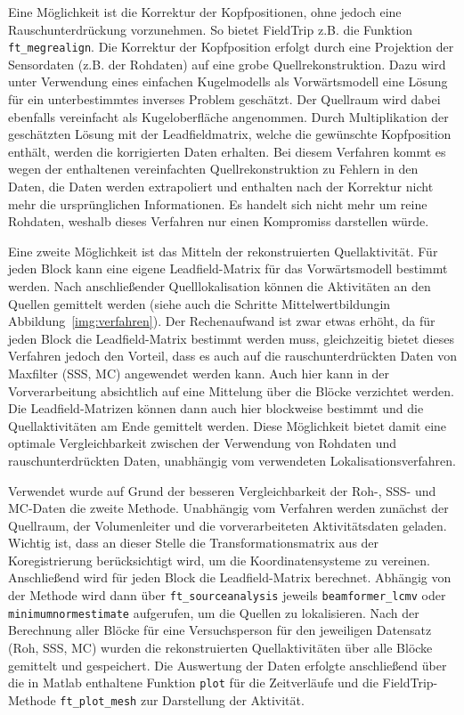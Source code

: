 \documentclass[doc,a4paper,12pt]{apa6}
\begin{document}
Eine Möglichkeit ist die Korrektur der Kopfpositionen, ohne jedoch eine Rauschunterdrückung vorzunehmen. So bietet FieldTrip z.B. die Funktion \texttt{ft\_megrealign}. Die Korrektur der Kopfposition erfolgt durch eine Projektion der Sensordaten (z.B. der Rohdaten) auf eine grobe Quellrekonstruktion. Dazu wird unter Verwendung eines einfachen Kugelmodells als Vorwärtsmodell eine Lösung für ein unterbestimmtes inverses Problem geschätzt. Der Quellraum wird dabei ebenfalls vereinfacht als Kugeloberfläche angenommen. Durch Multiplikation der geschätzten Lösung mit der Leadfieldmatrix, welche die gewünschte Kopfposition enthält, werden die korrigierten Daten erhalten. Bei diesem Verfahren kommt es wegen der enthaltenen vereinfachten Quellrekonstruktion zu Fehlern in den Daten, die Daten werden extrapoliert und enthalten nach der Korrektur nicht mehr die ursprünglichen Informationen. Es handelt sich nicht mehr um reine Rohdaten, weshalb dieses Verfahren nur einen Kompromiss darstellen würde.

Eine zweite Möglichkeit ist das Mitteln der rekonstruierten Quellaktivität. Für jeden Block kann eine eigene Leadfield-Matrix für das Vorwärtsmodell bestimmt werden. Nach anschließender Quelllokalisation können die Aktivitäten an den Quellen gemittelt werden (siehe auch die Schritte \glqq Mittelwertbildung\grqq in Abbildung~\ref{img:verfahren}). Der Rechenaufwand ist zwar etwas erhöht, da für jeden Block die Leadfield-Matrix bestimmt werden muss, gleichzeitig bietet dieses Verfahren jedoch den Vorteil, dass es auch auf die rauschunterdrückten Daten von Maxfilter (SSS, MC) angewendet werden kann. Auch hier kann in der Vorverarbeitung absichtlich auf eine Mittelung über die Blöcke verzichtet werden. Die Leadfield-Matrizen können dann auch hier blockweise bestimmt und die Quellaktivitäten am Ende gemittelt werden. Diese Möglichkeit bietet damit eine optimale Vergleichbarkeit zwischen der Verwendung von Rohdaten und rauschunterdrückten Daten, unabhängig vom verwendeten Lokalisationsverfahren.

Verwendet wurde auf Grund der besseren Vergleichbarkeit der Roh-, SSS- und MC-Daten die zweite Methode. Unabhängig vom Verfahren werden zunächst der Quellraum, der Volumenleiter und die vorverarbeiteten Aktivitätsdaten geladen. Wichtig ist, dass an dieser Stelle die Transformationsmatrix aus der Koregistrierung berücksichtigt wird, um die Koordinatensysteme zu vereinen. Anschließend wird für jeden Block die Leadfield-Matrix berechnet. Abhängig von der Methode wird dann über \texttt{ft\_sourceanalysis} jeweils \texttt{beamformer\_lcmv} oder \texttt{minimumnormestimate} aufgerufen, um die Quellen zu lokalisieren. Nach der Berechnung aller Blöcke für eine Versuchsperson für den jeweiligen Datensatz (Roh, SSS, MC) wurden die rekonstruierten Quellaktivitäten über alle Blöcke gemittelt und gespeichert. Die Auswertung der Daten erfolgte anschließend über die in Matlab enthaltene Funktion \texttt{plot} für die Zeitverläufe und die FieldTrip-Methode \texttt{ft\_plot\_mesh} zur Darstellung der Aktivität.
\end{document}
